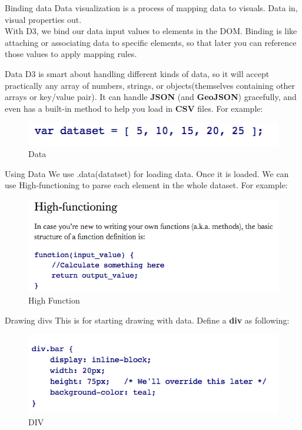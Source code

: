 \documentclass{beamer}
\begin{document}
\begin{frame}{Binding data}
Data visualization is a process of mapping data to visuals. Data in, visual properties out. \\
With D3, we bind our data input values to elements in the DOM. Binding is like attaching or associating data to specific elements, so that later you can reference those values to apply mapping rules.
\end{frame}

\begin{frame}{Data}
D3 is smart about handling different kinds of data, so it will accept practically any array of numbers, strings, or objects(themselves containing other arrays or key/value pair). It can handle \textbf{JSON} (and \textbf{GeoJSON}) gracefully, and even has a built-in method to help you load in \textbf{CSV} files. 
For example:
\begin{figure}
\centering
\includegraphics[width=1.0\textwidth]{./images/Data.png}
\caption{\label{fig:data} Data}
\end{figure}
\end{frame}

\begin{frame}{Using Data}
We use .data(datatset) for loading data. Once it is loaded. We can use High-functioning to parse each element in the whole dataset. For example:
\begin{figure}
\centering
\includegraphics[width=1.0\textwidth]{./images/High_function.png}
\caption{\label{fig:high} High Function}
\end{figure}
\end{frame}

\begin{frame}{Drawing divs}
This is for starting drawing with data. Define a \textbf{div} as following:
\begin{figure}
\centering
\includegraphics[width=1.0\textwidth]{./images/DIV.png}
\caption{\label{fig:div} DIV}
\end{figure}
\end{frame}
\end{document}

